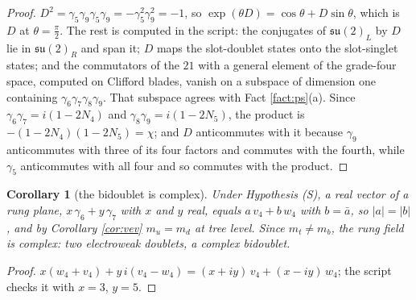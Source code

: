 \documentclass[11pt]{article}
\newtheorem{corollary}[theorem]{Corollary}
\theoremstyle{definition}
\newcommand{\su}{\mathfrak{su}}
\begin{document}
\begin{proof}
$D^{2} = \gamma_{5}\gamma_{9}\gamma_{5}\gamma_{9} = -\gamma_{5}^{2}\gamma_{9}^{2} = -1$, so $\exp(\theta D) = \cos\theta + D\sin\theta$, which is $D$ at $\theta = \tfrac{\pi}{2}$. The rest is computed in the script: the conjugates of $\su(2)_{L}$ by $D$ lie in $\su(2)_{R}$ and span it; $D$ maps the slot-doublet states onto the slot-singlet states; and the commutators of the $21$ with a general element of the grade-four space, computed on Clifford blades, vanish on a subspace of dimension one containing $\gamma_{6}\gamma_{7}\gamma_{8}\gamma_{9}$. That subspace agrees with Fact \ref{fact:ps}(a). Since $\gamma_{6}\gamma_{7} = i(1 - 2N_{4})$ and $\gamma_{8}\gamma_{9} = i(1 - 2N_{5})$, the product is $-(1 - 2N_{4})(1 - 2N_{5}) = \chi$; and $D$ anticommutes with it because $\gamma_{9}$ anticommutes with three of its four factors and commutes with the fourth, while $\gamma_{5}$ anticommutes with all four and so commutes with the product.
\end{proof}

\begin{corollary}[the bidoublet is complex]\label{cor:complexrung}
Under Hypothesis (S), a real vector of a rung plane, $x\,\gamma_{6} + y\,\gamma_{7}$ with $x$ and $y$ real, equals $a\,v_{4} + b\,w_{4}$ with $b = \bar{a}$, so $|a| = |b|$, and by Corollary \ref{cor:vev} $m_{u} = m_{d}$ at tree level. Since $m_{t} \ne m_{b}$, the rung field is complex: two electroweak doublets, a complex bidoublet.
\end{corollary}

\begin{proof}
$x(w_{4} + v_{4}) + y\,i(v_{4} - w_{4}) = (x + iy)\,v_{4} + (x - iy)\,w_{4}$; the script checks it with $x = 3$, $y = 5$.
\end{proof}
\end{document}
